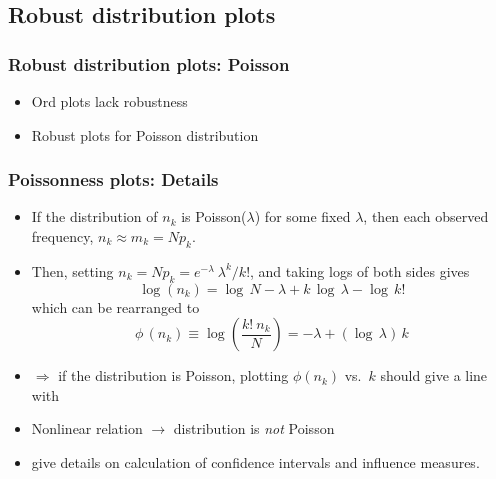 \subsection{Robust distribution plots}
\begin{frame}
  \frametitle{Robust distribution plots: Poisson}
  \begin{itemize}
	\item Ord plots lack robustness 

	\item Robust plots for Poisson distribution \citep{HoaglinTukey:85}
  \end{itemize}
\end{frame}

\begin{frame}
  \frametitle{Poissonness plots: Details}
  \begin{itemize}
	\item If the distribution of $n_k$ is Poisson($\lambda$) for some fixed $\lambda$, then each
	observed frequency, $n_k \approx m_k = N p_k$.
	\item Then, setting
\(n_k = N p_k  = { e^{ - \lambda } \:  \lambda^k } /  { k ! }\),
and taking logs of both sides gives
  \[
  \log ( n_k ) = \log \,  N - \lambda  +  k \,  \log \,  \lambda  -
  \log \,  k !
  \]
which can be rearranged to
  \begin{equation*}
  \phi \,  ( n_k )  \equiv \log \left(  \frac{ k ! \:  n_k } {N} \right)
 = - \lambda  +  ( \log \,  \lambda ) \,  k
  \end{equation*}

	\item $\Rightarrow$ if the distribution is Poisson,
	plotting \(\phi ( n_k )\) vs.\ \(k\) should give a line with
	\item Nonlinear relation $\rightarrow$ distribution is \emph{not} Poisson
    \item \citet{HoaglinTukey:85} give details on calculation of confidence intervals
	and influence measures.
  \end{itemize}
\end{frame}

